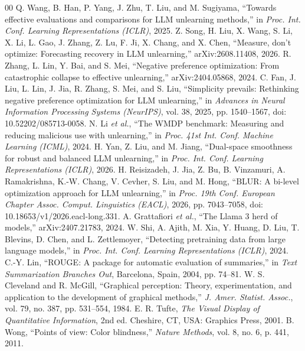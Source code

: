 \documentclass[conference]{IEEEtran}
\begin{document}
\begin{thebibliography}{00}
 Q. Wang, B. Han, P. Yang, J. Zhu, T. Liu, and M. Sugiyama, ``Towards effective evaluations and comparisons for LLM unlearning methods,'' in \textit{Proc. Int. Conf. Learning Representations (ICLR)}, 2025.
 Z. Song, H. Liu, X. Wang, S. Li, X. Li, L. Gao, J. Zhang, Z. Lu, F. Ji, X. Chang, and X. Chen, ``Measure, don't optimize: Forecasting recovery in LLM unlearning,'' arXiv:2608.11408, 2026.
 R. Zhang, L. Lin, Y. Bai, and S. Mei, ``Negative preference optimization: From catastrophic collapse to effective unlearning,'' arXiv:2404.05868, 2024.
 C. Fan, J. Liu, L. Lin, J. Jia, R. Zhang, S. Mei, and S. Liu, ``Simplicity prevails: Rethinking negative preference optimization for LLM unlearning,'' in \textit{Advances in Neural Information Processing Systems (NeurIPS)}, vol. 38, 2025, pp. 1540--1567, doi: 10.52202/085713-0058.
 N. Li \textit{et al.}, ``The WMDP benchmark: Measuring and reducing malicious use with unlearning,'' in \textit{Proc. 41st Int. Conf. Machine Learning (ICML)}, 2024.
 H. Yan, Z. Liu, and M. Jiang, ``Dual-space smoothness for robust and balanced LLM unlearning,'' in \textit{Proc. Int. Conf. Learning Representations (ICLR)}, 2026.
 H. Reisizadeh, J. Jia, Z. Bu, B. Vinzamuri, A. Ramakrishna, K.-W. Chang, V. Cevher, S. Liu, and M. Hong, ``BLUR: A bi-level optimization approach for LLM unlearning,'' in \textit{Proc. 19th Conf. European Chapter Assoc. Comput. Linguistics (EACL)}, 2026, pp. 7043--7058, doi: 10.18653/v1/2026.eacl-long.331.
 A. Grattafiori \textit{et al.}, ``The Llama 3 herd of models,'' arXiv:2407.21783, 2024.
 W. Shi, A. Ajith, M. Xia, Y. Huang, D. Liu, T. Blevins, D. Chen, and L. Zettlemoyer, ``Detecting pretraining data from large language models,'' in \textit{Proc. Int. Conf. Learning Representations (ICLR)}, 2024.
 C.-Y. Lin, ``ROUGE: A package for automatic evaluation of summaries,'' in \textit{Text Summarization Branches Out}, Barcelona, Spain, 2004, pp. 74--81.
 W. S. Cleveland and R. McGill, ``Graphical perception: Theory, experimentation, and application to the development of graphical methods,'' \textit{J. Amer. Statist. Assoc.}, vol. 79, no. 387, pp. 531--554, 1984.
 E. R. Tufte, \textit{The Visual Display of Quantitative Information}, 2nd ed. Cheshire, CT, USA: Graphics Press, 2001.
 B. Wong, ``Points of view: Color blindness,'' \textit{Nature Methods}, vol. 8, no. 6, p. 441, 2011.
\end{thebibliography}
\end{document}
